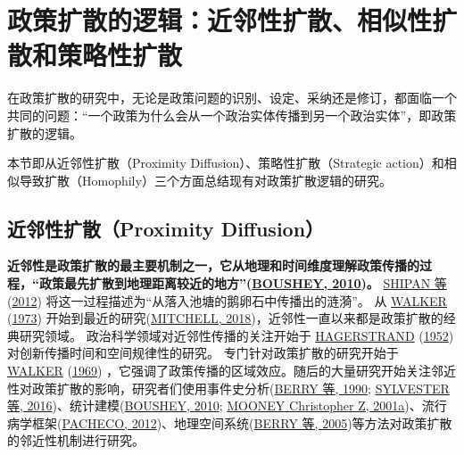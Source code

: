 \documentclass[
  12pt,
]{ctexart}
\begin{document}
\newpage

\hypertarget{ux653fux7b56ux6269ux6563ux7684ux903bux8f91ux8fd1ux90bbux6027ux6269ux6563ux76f8ux4f3cux6027ux6269ux6563ux548cux7b56ux7565ux6027ux6269ux6563}{%
\section{政策扩散的逻辑：近邻性扩散、相似性扩散和策略性扩散}\label{ux653fux7b56ux6269ux6563ux7684ux903bux8f91ux8fd1ux90bbux6027ux6269ux6563ux76f8ux4f3cux6027ux6269ux6563ux548cux7b56ux7565ux6027ux6269ux6563}}

在政策扩散的研究中，无论是政策问题的识别、设定、采纳还是修订，都面临一个共同的问题：``一个政策为什么会从一个政治实体传播到另一个政治实体''，即政策扩散的逻辑。

本节即从近邻性扩散（Proximity Diffusion）、策略性扩散（Strategic action）和相似导致扩散（Homophily）三个方面总结现有对政策扩散逻辑的研究。

\hypertarget{ux8fd1ux90bbux6027ux6269ux6563proximity-diffusion}{%
\subsection{近邻性扩散（Proximity Diffusion）}\label{ux8fd1ux90bbux6027ux6269ux6563proximity-diffusion}}

\textbf{近邻性是政策扩散的最主要机制之一，它从地理和时间维度理解政策传播的过程，``政策最先扩散到地理距离较近的地方''(\protect\hyperlink{ref-Boushey2010}{BOUSHEY, 2010})。}
\protect\hyperlink{ref-ShipanVolden2012}{SHIPAN 等} (\protect\hyperlink{ref-ShipanVolden2012}{2012}) 将这一过程描述为``从落入池塘的鹅卵石中传播出的涟漪''。
从 \protect\hyperlink{ref-Walker1973}{WALKER} (\protect\hyperlink{ref-Walker1973}{1973}) 开始到最近的研究(\protect\hyperlink{ref-Mitchell2018}{MITCHELL, 2018})，近邻性一直以来都是政策扩散的经典研究领域。
政治科学领域对近邻性传播的关注开始于 \protect\hyperlink{ref-Hagerstrand1952}{HAGERSTRAND} (\protect\hyperlink{ref-Hagerstrand1952}{1952}) 对创新传播时间和空间规律性的研究。
专门针对政策扩散的研究开始于 \protect\hyperlink{ref-Walker1969}{WALKER} (\protect\hyperlink{ref-Walker1969}{1969}) ，它强调了政策传播的区域效应。随后的大量研究开始关注邻近性对政策扩散的影响，研究者们使用事件史分析(\protect\hyperlink{ref-BerryBerry1990}{BERRY 等, 1990}; \protect\hyperlink{ref-SylvesterHaider-Markel2016}{SYLVESTER 等, 2016})、统计建模(\protect\hyperlink{ref-Boushey2010}{BOUSHEY, 2010}; \protect\hyperlink{ref-Mooney2001}{MOONEY Christopher Z, 2001a})、流行病学框架(\protect\hyperlink{ref-Pacheco2012a}{PACHECO, 2012})、地理空间系统(\protect\hyperlink{ref-BerryBaybeck2005}{BERRY 等, 2005})等方法对政策扩散的邻近性机制进行研究。
\end{document}
